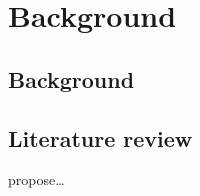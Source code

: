 \chapter{Background}
\label{ch:background}


\section{Background}

\section{Literature review}

\textcite{foo2017} propose…

